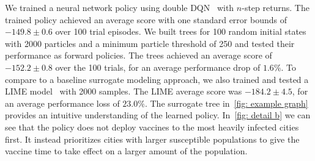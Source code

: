 \documentclass[letterpaper]{article} %
\begin{document}
We trained a neural network policy using double DQN~\cite{hasselt2010} with $n$-step returns.
The trained policy achieved an average score with one standard error bounds of $-149.8 \pm 0.6$ over 100 trial episodes.
We built trees for 100 random initial states with 2000 particles and a minimum particle threshold of 250 and tested their performance as forward policies.
The trees achieved an average score of $-152.2 \pm 0.8$ over the 100 trials, for an average performance drop of $1.6 \%$.
To compare to a baseline surrogate modeling approach, we also trained and tested a LIME model~\cite{ribeiro2016} with 2000 samples.
The LIME average score was $-184.2 \pm 4.5$, for an average performance loss of $23.0 \%$.  The surrogate tree in~\cref{fig: example graph} provides an intuitive understanding of the learned policy.
In~\cref{fig: detail b} we can see that the policy does not deploy vaccines to the most heavily infected cities first.
It instead prioritizes cities with larger susceptible populations to give the vaccine time to take effect on a larger amount of the population.
\vspace{-1.44mm}
\vspace{-0.78mm}
\vspace{-2.33mm}
\end{document}
